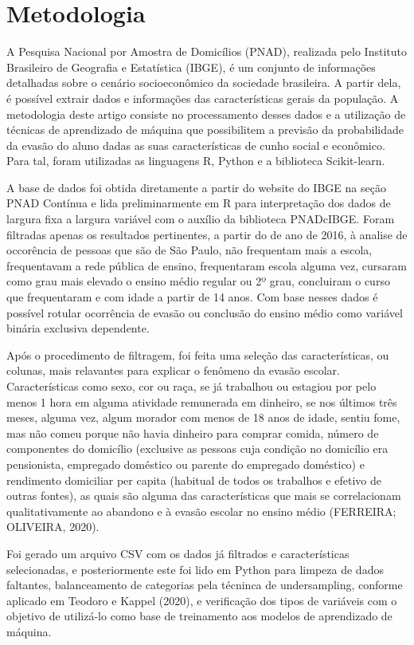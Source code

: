 \documentclass[english, spanish, brazilian]{RBIEarticle} %
\begin{document}
\section{Metodologia}
A Pesquisa Nacional por Amostra de Domicílios (PNAD), realizada pelo Instituto Brasileiro de Geografia e Estatística (IBGE), é um conjunto de informações detalhadas sobre o cenário socioeconômico da sociedade brasileira. A partir dela, é possível extrair dados e informações das características gerais da população. A metodologia deste artigo consiste no processamento desses dados e a utilização de técnicas de aprendizado de máquina que possibilitem a previsão da probabilidade da evasão do aluno dadas as suas características de cunho social e econômico. Para tal, foram utilizadas as linguagens R, Python e a biblioteca Scikit-learn.

A base de dados foi obtida diretamente a partir do website do IBGE na seção PNAD Contínua e lida preliminarmente em R para interpretação dos dados de largura fixa a largura variável com o auxílio da biblioteca PNADcIBGE. Foram filtradas apenas os resultados pertinentes, a partir do de ano de 2016, à analise de occorência de pessoas que são de São Paulo, não frequentam mais a escola, frequentavam a rede pública de ensino, frequentaram escola alguma vez, cursaram como grau mais elevado o ensino médio regular ou 2º grau, concluiram o curso que frequentaram e com idade a partir de 14 anos. Com base nesses dados é possível rotular ocorrência de evasão ou conclusão do ensino médio como variável binária exclusiva dependente.

Após o procedimento de filtragem, foi feita uma seleção das características, ou colunas, mais relavantes para explicar o fenômeno da evasão escolar. Características como sexo, cor ou raça, se já trabalhou ou estagiou por pelo menos 1 hora em alguma atividade remunerada em dinheiro, se nos últimos três meses, alguma vez, algum morador com menos de 18 anos de idade, sentiu fome, mas não comeu porque não havia dinheiro para comprar comida, número de componentes do domicílio (exclusive as pessoas cuja condição no domicílio era pensionista, empregado doméstico ou parente do empregado doméstico) e rendimento domiciliar per capita
(habitual de todos os trabalhos e efetivo de outras fontes), as quais são alguma das características que mais se correlacionam qualitativamente ao abandono e à evasão escolar no ensino médio (FERREIRA; OLIVEIRA, 2020).

Foi gerado um arquivo CSV com os dados já filtrados e características selecionadas, e posteriormente este foi lido em Python para limpeza de dados faltantes, balanceamento de categorias pela técninca de undersampling, conforme aplicado em Teodoro e Kappel (2020), e verificação dos tipos de variáveis com o objetivo de utilizá-lo como base de treinamento aos modelos de aprendizado de máquina.
\end{document}
